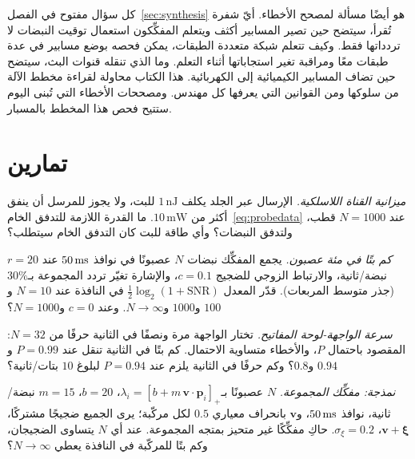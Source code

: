 كل سؤال مفتوح في الفصل~\ref{sec:synthesis} هو أيضًا مسألة لمصحح الأخطاء. أيّ شفرة تُقرأ، سيتضح حين تصير المسابير أكثف ويتعلم المفكِّكون استعمال توقيت النبضات لا تردداتها فقط. وكيف تتعلم شبكة متعددة الطبقات، يمكن فحصه بوضع مسابير في عدة طبقات معًا ومراقبة تغير استجاباتها أثناء التعلم. وما الذي تنقله قنوات البث، سيتضح حين تضاف المسابير الكيميائية إلى الكهربائية. هذا الكتاب محاولة لقراءة مخطط الآلة من سلوكها ومن القوانين التي يعرفها كل مهندس. ومصححات الأخطاء التي تُبنى اليوم ستتيح فحص هذا المخطط بالمسبار.

\section{تمارين}

\begin{exercise}[\lvlA]
\label{ex:17:1}
\emph{ميزانية القناة اللاسلكية.} الإرسال عبر الجلد يكلف $1\,\text{nJ}$ للبت، ولا يجوز للمرسل أن ينفق أكثر من $10\,\text{mW}$. ما القدرة اللازمة للتدفق الخام~\eqref{eq:probedata} عند $N=1000$ قطب، ولتدفق النبضات؟ وأي طاقة للبت كان التدفق الخام سيتطلب؟
\end{exercise}

\begin{exercise}[\lvlA]
\label{ex:17:2}
\emph{كم بتًا في مئة عصبون.} يجمع المفكِّك نبضات $N$ عصبونًا في نوافذ $50\,\text{ms}$ عند $r=20$ نبضة/ثانية، والارتباط الزوجي للضجيج $c=0.1$، والإشارة تغيّر تردد المجموعة بـ$30\%$ (جذر متوسط المربعات). قدّر المعدل $\tfrac12\log_2(1+\text{SNR})$ في النافذة عند $N=10$ و$100$ و$1000$ و$N\to\infty$. وعند $c=0$ و$N=1000$؟
\end{exercise}

\begin{exercise}[\lvlB]
\label{ex:17:3}
\emph{سرعة الواجهة-لوحة المفاتيح.} تختار الواجهة مرة ونصفًا في الثانية حرفًا من $N=32$: المقصود باحتمال $P$، والأخطاء متساوية الاحتمال. كم بتًا في الثانية تنقل عند $P=0.99$ و$0.94$ و$0.8$؟ وكم حرفًا في الثانية يلزم عند $P=0.94$ لبلوغ $10$ بتات/ثانية؟
\end{exercise}

\begin{exercise}[\lvlB]
\label{ex:17:4}
\emph{نمذجة: مفكِّك المجموعة.} $N$ عصبونًا بـ$\lambda_i=[b+m\,\mathbf v\cdot\mathbf p_i]_+$، $b=20$، $m=15$ نبضة/ثانية، نوافذ $50\,\text{ms}$، و$\mathbf v$ بانحراف معياري $0.5$ لكل مركّبة؛ يرى الجميع ضجيجًا مشتركًا، $\mathbf v+\boldsymbol\xi$، $\sigma_\xi=0.2$. حاكِ مفكِّكًا غير متحيز بمتجه المجموعة. عند أي $N$ يتساوى الضجيجان، وكم بتًا للمركّبة في النافذة يعطي $N\to\infty$؟
\end{exercise}

